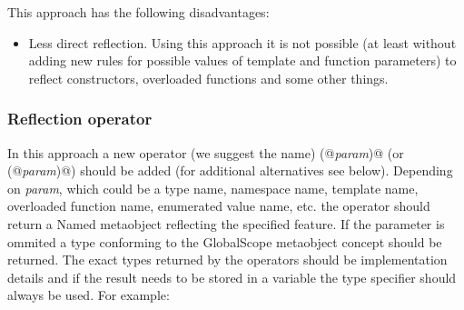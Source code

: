 This approach has the following disadvantages:

\begin{itemize}
	\item Less direct reflection. Using this approach it is not possible
	(at least without adding new rules for possible values of template
	and function parameters) to reflect constructors, overloaded functions
	and some other things.
\end{itemize}

\subsubsection{Reflection operator}

In this approach a new operator (we suggest the name) \verb@reflected(@{\em param}\verb@)@
(or \verb@mirrored(@{\em param}\verb@)@)
should be added (for additional alternatives see below).
Depending on {\em param}, which could be a type name, namespace name,
template name, overloaded function name, enumerated value name, etc. the operator should
return a {\metaobject Named} metaobject reflecting the specified feature.
If the parameter is ommited a type conforming to the {\metaobject GlobalScope} metaobject
concept should be returned.
The exact types returned by the operators should be implementation details and if the
result needs to be stored in a variable the \verb@auto@ type specifier should always
be used.
For example:

